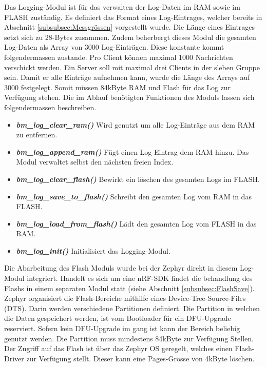 Das Logging-Modul ist für das verwalten der Log-Daten im RAM sowie im FLASH zuständig. Es definiert das Format eines Log-Eintrages, welcher bereits in Abschnitt \ref{subsubsec:Messgrössen} vorgestellt wurde. Die Länge eines Eintrages setzt sich zu 28-Bytes zusammen. Zudem beherbergt dieses Modul die gesamten Log-Daten als Array von 3000 Log-Einträgen. Diese konstante kommt folgendermassen zustande. Pro Client können maximal 1000 Nachrichten verschickt werden. Ein Server soll mit maximal drei Clients in der sleben Gruppe sein. Damit er alle Einträge aufnehmen kann, wurde die Länge des Arrays auf 3000 festgelegt. Somit müssen 84kByte RAM und Flash für das Log zur Verfügung stehen. Die im Ablauf benötigten Funktionen des Moduls lassen sich folgendermassen beschreiben. 

\begin{itemize}
	\item \textit{\textbf{bm\_log\_clear\_ram()}} Wird genutzt um alle Log-Einträge aus dem RAM zu entfernen.
	\item \textit{\textbf{bm\_log\_append\_ram()}} Fügt einen Log-Eintrag dem RAM hinzu. Das Modul verwaltet selbst den nächsten freien Index. 
	\item \textit{\textbf{bm\_log\_clear\_flash()}} Bewirkt ein löschen des gesamten Logs im FLASH. 
	\item \textit{\textbf{bm\_log\_save\_to\_flash()}} Schreibt den gesamten Log vom RAM in das FLASH. 
	\item \textit{\textbf{bm\_log\_load\_from\_flash()}} Lädt den gesamten Log vom FLASH in das RAM. 
	\item \textit{\textbf{bm\_log\_init()}} Initialisiert das Logging-Modul.
\end{itemize} 

Die Abarbeitung des Flash Moduls wurde bei der Zephyr direkt in diesem Log-Modul integriert. Handelt es sich um eine nRF-SDK findet die behandlung des Flashs in einem separaten Modul statt (siehe Abschnitt \ref{subsubsec:FlashSave}). \\

Zephyr organisiert die Flash-Bereiche mithilfe eines Device-Tree-Source-Files (DTS). Darin werden verschiedene Partitionen definiert. Die Partition in welchen die Daten gespeichert werden, ist vom Bootloader für ein DFU-Upgrade reserviert. Sofern kein DFU-Upgrade im gang ist kann der Bereich beliebig genutzt werden. Die Partition muss mindestens 84kByte zur Verfügung Stellen. Der Zugriff auf das Flash ist über das Zephyr OS geregelt, welches einen Flash-Driver zur Verfügung stellt. Dieser kann eine Pages-Grösse von 4kByte löschen. 

